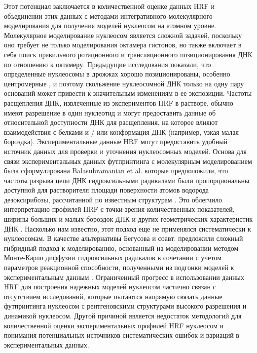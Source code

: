 Этот потенциал заключается в количественной оценке данных HRF и объединении этих данных с методами интегративного молекулярного моделирования для получения моделей нуклеосом на атомном уровне. Молекулярное моделирование нуклеосом является сложной задачей, поскольку оно требует не только моделирования октамера гистонов, но также включает в себя поиск правильного ротационного и трансляционного позиционирования ДНК по отношению к октамеру. Предыдущие исследования показали, что определенные нуклеосомы в дрожжах хорошо позиционированы, особенно центромерные \cite{cole_centromeric_2011}, и поэтому скольжение нуклеосомной ДНК только на одну пару оснований может привести к значительным изменениям в ее экспозиции. Частоты расщепления ДНК, извлеченные из экспериментов HRF в растворе, обычно имеют разрешение в один нуклеотид и могут предоставить данные об относительной доступности ДНК для расщепления, на которое влияют взаимодействия с белками и / или конформация ДНК (например, узкая малая бороздка). Экспериментальные данные HRF могут предоставить удобный источник данных для проверки и уточнения нуклеосомных моделей.
Основа для связи экспериментальных данных футпринтинга с молекулярным моделированием была сформулирована Balasubramanian et al. которые предположили, что частоты разрыва цепи ДНК гидроксильными радикалами были пропорциональны доступной для растворителя площади поверхности атомов водорода дезоксирибозы, рассчитанной по известным структурам \cite{balasubramanian_dna_1998}. Это облегчило интерпретацию профилей HRF с точки зрения количественных показателей, ширины больших и малых бороздок ДНК и других геометрических характеристик ДНК \cite{bishop_map_2011,pastor_detailed_2000}. Насколько нам известно, этот подход еще не применялся систематически к нуклеосомам. В качестве альтернативы Бегусова и соавт. предложили сложный гибридный подход к моделированию, основанный на моделировании методом Монте-Карло диффузии гидроксильных радикалов в сочетании с учетом параметров реакционной способности, полученными из подгонки моделей к экспериментальным данным \cite{begusova_radack_2001,begusova_radiolysis_2000}.
Ограниченный прогресс в использовании данных HRF для построения надежных моделей нуклеосом частично связан с отсутствием исследований, которые пытаются напрямую связать данные футпринтинга нуклеосом с рентгеновскими структурами высокого разрешения и динамикой нуклеосом. Другой причиной является недостаток методологий для количественной оценки экспериментальных профилей HRF нуклеосом и понимания потенциальных источников систематических ошибок и вариаций в экспериментальных данных.
